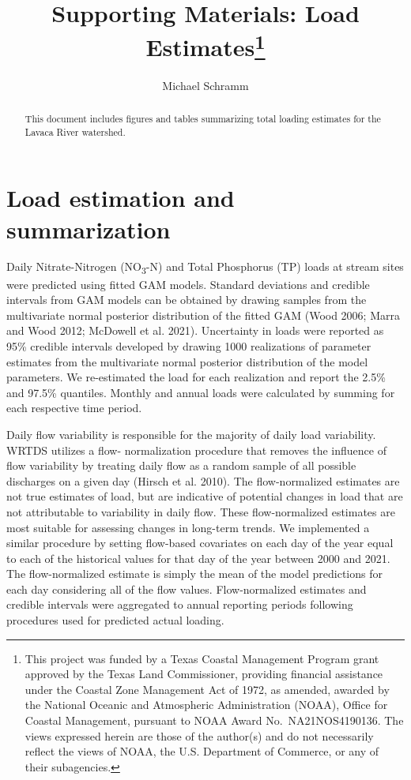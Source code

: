 \documentclass[
]{article}
\title{Supporting Materials: Load Estimates\thanks{This project was
funded by a Texas Coastal Management Program grant approved by the Texas
Land Commissioner, providing financial assistance under the Coastal Zone
Management Act of 1972, as amended, awarded by the National Oceanic and
Atmospheric Administration (NOAA), Office for Coastal Management,
pursuant to NOAA Award No.~NA21NOS4190136. The views expressed herein
are those of the author(s) and do not necessarily reflect the views of
NOAA, the U.S. Department of Commerce, or any of their subagencies.}}
\author{Michael Schramm}
\date{}
\begin{document}
\maketitle
\begin{abstract}
This document includes figures and tables summarizing total loading
estimates for the Lavaca River watershed.
\end{abstract}
\ifdefined\Shaded\renewenvironment{Shaded}{\begin{tcolorbox}[sharp corners, breakable, enhanced, interior hidden, boxrule=0pt, borderline west={3pt}{0pt}{shadecolor}, frame hidden]}{\end{tcolorbox}}\fi

\hypertarget{load-estimation-and-summarization}{%
\section{Load estimation and
summarization}\label{load-estimation-and-summarization}}

Daily Nitrate-Nitrogen (NO\textsubscript{3}-N) and Total Phosphorus (TP)
loads at stream sites were predicted using fitted GAM models. Standard
deviations and credible intervals from GAM models can be obtained by
drawing samples from the multivariate normal posterior distribution of
the fitted GAM (Wood 2006; Marra and Wood 2012; McDowell et al. 2021).
Uncertainty in loads were reported as 95\% credible intervals developed
by drawing 1000 realizations of parameter estimates from the
multivariate normal posterior distribution of the model parameters. We
re-estimated the load for each realization and report the 2.5\% and
97.5\% quantiles. Monthly and annual loads were calculated by summing
for each respective time period.

Daily flow variability is responsible for the majority of daily load
variability. WRTDS utilizes a flow- normalization procedure that removes
the influence of flow variability by treating daily flow as a random
sample of all possible discharges on a given day (Hirsch et al. 2010).
The flow-normalized estimates are not true estimates of load, but are
indicative of potential changes in load that are not attributable to
variability in daily flow. These flow-normalized estimates are most
suitable for assessing changes in long-term trends. We implemented a
similar procedure by setting flow-based covariates on each day of the
year equal to each of the historical values for that day of the year
between 2000 and 2021. The flow-normalized estimate is simply the mean
of the model predictions for each day considering all of the flow
values. Flow-normalized estimates and credible intervals were aggregated
to annual reporting periods following procedures used for predicted
actual loading.
\end{document}
